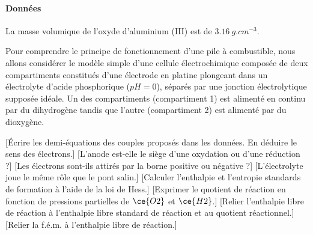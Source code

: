     \paragraph{Données} La masse volumique de l'oxyde d'aluminium (III) est de $\SI{3.16}{g.cm^{-3}}$.

    Pour comprendre le principe de fonctionnement d’une pile à combustible, nous allons considérer le modèle simple d’une cellule électrochimique composée de deux compartiments constitués d’une électrode en platine plongeant dans un électrolyte d’acide phosphorique ($pH = 0$), séparés par une jonction électrolytique supposée idéale. Un des compartiments (compartiment 1) est alimenté en continu par du dihydrogène tandis que l’autre (compartiment 2) est alimenté par du dioxygène.
    \begin{enumerate}
        [Écrire les demi-équations des couples proposés dans les données. En déduire le sens des électrons.]
        [L'anode est-elle le siège d'une oxydation ou d'une réduction ?]
        [Les électrons sont-ils attirés par la borne positive ou négative ?]
        [L'électrolyte joue le même rôle que le pont salin.]
        [Calculer l'enthalpie et l'entropie standards de formation à l'aide de la loi de Hess.]
        [Exprimer le quotient de réaction en fonction de pressions partielles de $\ce{O2}$ et $\ce{H2}$.]
        [Relier l'enthalpie libre de réaction à l'enthalpie libre standard de réaction et au quotient réactionnel.]
        [Relier la f.é.m. à l'enthalpie libre de réaction.]
    \end{enumerate}

